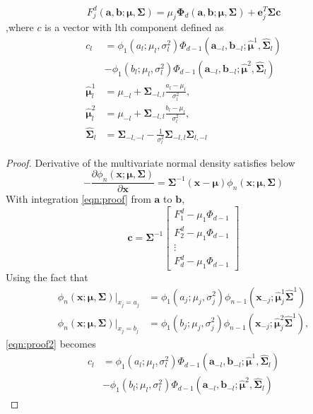 \begin{theorem}\label{thm:thmkan}\citep{kan2017moments}
$$F_j^d(\mathbf{a},\mathbf{b};\boldsymbol{\mu},\boldsymbol{\Sigma})= \mu_j\boldsymbol{\Phi}_d(\mathbf{a},\mathbf{b};\boldsymbol{\mu},\boldsymbol{\Sigma})+\mathbf{e}_j^T\boldsymbol{\Sigma}\mathbf{c}$$
,where $c$ is a vector with lth component defined as
$$\begin{aligned}
c_l&=\phi_1(a_l;\mu_l,\sigma_l^2)\Phi_{d-1}(\mathbf{a}_{-l},\mathbf{b}_{-l};\boldsymbol{\hat{\mu}}^1, \hat{\boldsymbol{\Sigma}}_l)\\
&-\phi_1(b_l;\mu_l,\sigma_l^2)\Phi_{d-1}(\mathbf{a}_{-l},\mathbf{b}_{-l};\boldsymbol{\hat{\mu}}^2, \hat{\boldsymbol{\Sigma}}_l)\\
\boldsymbol{\hat{\mu}}^1_l&=\mu_{-l}+\boldsymbol{\Sigma}_{-l,l}\frac{a_l-\mu_l}{\sigma_l^2},\\
\boldsymbol{\hat{\mu}}^2_l&=\mu_{-l}+\boldsymbol{\Sigma}_{-l,l}\frac{b_l-\mu_l}{\sigma_l^2},\\
\hat{\boldsymbol{\Sigma}}_l&=\boldsymbol{\Sigma}_{-l,-l} -\frac{1}{\sigma_l^2}\boldsymbol{\Sigma}_{-l,l}\boldsymbol{\Sigma}_{l,-l}
\end{aligned}$$
\end{theorem}
\begin{proof}
	Derivative of the multivariate normal density satisfies below
	\begin{equation}\label{eqn:proof}
	-\frac{\partial\phi_n(\mathbf{x};\boldsymbol{\mu},\boldsymbol{\Sigma})}{\partial\mathbf{x}}=\boldsymbol{\Sigma}^{-1}(\mathbf{x}-\mathbf{\mu})\phi_n(\mathbf{x};\boldsymbol{\mu},\boldsymbol{\Sigma})
	\end{equation}
	With integration \eqref{eqn:proof} from $\mathbf{a}$ to $\mathbf{b}$,
	\begin{equation}\label{eqn:proof2}
	\boldsymbol{c}=\boldsymbol{\Sigma}^{-1}\begin{bmatrix}
	F_1^d-\mu_1\Phi_{d-1}\\
	F_2^d-\mu_1\Phi_{d-1}\\
	\vdots\\
	F_d^d-\mu_1\Phi_{d-1}
	\end{bmatrix}
	\end{equation}
	Using the fact that
	$$\begin{aligned}
	\phi_n(\mathbf{x};\boldsymbol{\mu},\boldsymbol{\Sigma})\vert_{x_j=a_j}&=\phi_1(a_j;\mu_j,\sigma_j^2)\phi_{n-1}(\mathbf{x}_{-j};\boldsymbol{\hat{\mu}}^1_j\hat{\boldsymbol{\Sigma}}^1)\\
	\phi_n(\mathbf{x};\boldsymbol{\mu},\boldsymbol{\Sigma})\vert_{x_j=b_j}&=\phi_1(b_j;\mu_j,\sigma_j^2)\phi_{n-1}(\mathbf{x}_{-j};\boldsymbol{\hat{\mu}}^2_j\hat{\boldsymbol{\Sigma}}^1),
	\end{aligned}$$
	\eqref{eqn:proof2} becomes
	$$\begin{aligned}
	c_l&=\phi_1(a_l;\mu_l,\sigma_l^2)\Phi_{d-1}(\mathbf{a}_{-l},\mathbf{b}_{-l};\boldsymbol{\hat{\mu}}^1, \hat{\boldsymbol{\Sigma}}_l)\\
	&-\phi_1(b_l;\mu_l,\sigma_l^2)\Phi_{d-1}(\mathbf{a}_{-l},\mathbf{b}_{-l};\boldsymbol{\hat{\mu}}^2, \hat{\boldsymbol{\Sigma}}_l)
	\end{aligned}$$
\end{proof}
